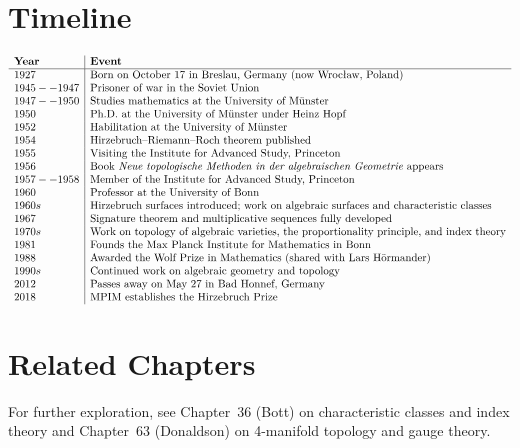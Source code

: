 \section*{Timeline}
\[
\begin{array}{l|l}
\textbf{Year} & \textbf{Event} \\ \hline
1927 & \text{Born on October 17 in Breslau, Germany (now Wroc\l aw, Poland)} \\
1945--1947 & \text{Prisoner of war in the Soviet Union} \\
1947--1950 & \text{Studies mathematics at the University of M\"unster} \\
1950 & \text{Ph.D.\ at the University of M\"unster under Heinz Hopf} \\
1952 & \text{Habilitation at the University of M\"unster} \\
1954 & \text{Hirzebruch--Riemann--Roch theorem published} \\
1955 & \text{Visiting the Institute for Advanced Study, Princeton} \\
1956 & \text{Book \textit{Neue topologische Methoden in der
algebraischen Geometrie} appears} \\
1957--1958 & \text{Member of the Institute for Advanced Study, Princeton} \\
1960 & \text{Professor at the University of Bonn} \\
1960s & \text{Hirzebruch surfaces introduced; work on algebraic
surfaces and characteristic classes} \\
1967 & \text{Signature theorem and multiplicative sequences fully developed} \\
1970s & \text{Work on topology of algebraic varieties, the proportionality
principle, and index theory} \\
1981 & \text{Founds the Max Planck Institute for Mathematics in Bonn} \\
1988 & \text{Awarded the Wolf Prize in Mathematics (shared with
Lars H\"ormander)} \\
1990s & \text{Continued work on algebraic geometry and topology} \\
2012 & \text{Passes away on May 27 in Bad Honnef, Germany} \\
2018 & \text{MPIM establishes the Hirzebruch Prize}
\end{array}
\]

\section{Related Chapters}
For further exploration, see Chapter~36 (Bott) on characteristic classes and index theory and Chapter~63 (Donaldson) on 4-manifold topology and gauge theory.


